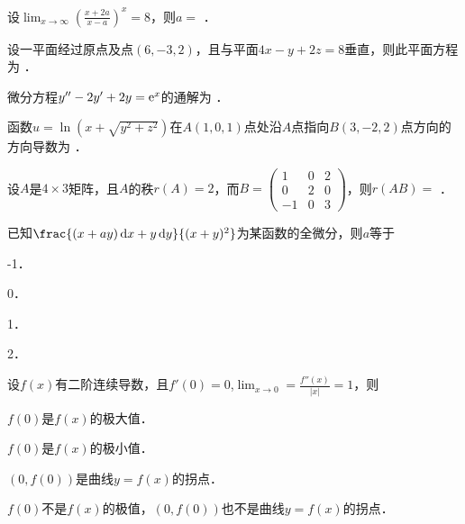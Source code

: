 \documentclass[plain,noanswer,medmath]{../../template/jnuexam}
\begin{document}




\begin{problem}
设$\lim_{x \to \infty} \left(\frac{x + 2a}{x - a} \right)^x = 8$，则$a =$ \fillin{}．
\end{problem}


\begin{problem}
设一平面经过原点及点$(6, - 3,2)$，且与平面$4x - y + 2z = 8$垂直，则此平面方程为 \fillin{}．
\end{problem}


\begin{problem}
微分方程$y'' - 2y' + 2y = \mathrm{e}^x$的通解为 \fillin{}．
\end{problem}


\begin{problem}
函数$u=\ln(x+\sqrt{y^2+z^2})$在$A(1,0,1)$点处沿$A$点指向$B(3,-2,2)$点方向的方向导数为 \fillin{}．
\end{problem}


\begin{problem}
设$A$是$4 \times 3$矩阵，且$A$的秩$r(A) = 2$，而$B = \begin{pmatrix}
   1 & 0 & 2 \\
   0 & 2 & 0 \\
  -1 & 0 & 3
\end{pmatrix}$，则$r(AB) =$ \fillin{}．
\end{problem}




\begin{problem}
已知$\frac{(x + ay)\dx + y\dy}{(x + y)^2}$为某函数的全微分，则$a$等于\pickout{}
\begin{abcd}
\item -1．        
\item 0．        
\item 1．        
\item 2．
\end{abcd}
\end{problem}


\begin{problem}
设$f(x)$有二阶连续导数，且$f'(0) = 0$,$\lim_{x \to 0} = \frac{f''(x)}{|x|} = 1$，则\pickout{}
\begin{abcd}
\item $f(0)$是$f(x)$的极大值．
\item $f(0)$是$f(x)$的极小值．
\item $(0,f(0))$是曲线$y = f(x)$的拐点．
\item $f(0)$不是$f(x)$的极值，$(0,f(0))$也不是曲线$y = f(x)$的拐点． 
\end{abcd}
\end{problem}
\end{document}
